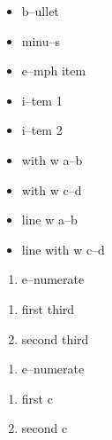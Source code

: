\documentclass{book}
\begin{document}
\begin{titlepage}
\begin{itemize}[label=\textbullet{}]
\item b--ullet
\end{itemize}

\begin{itemize}[label=-]
\item minu--s
\end{itemize}

\begin{itemize}[label=\emph{after emph}]
\item e--mph item
\end{itemize}

\begin{itemize}[label=\textbullet{} a--n itemize line]
\item {}%
i--tem 1
\item i--tem 2
\end{itemize}

\begin{itemize}[label={}]
\item with w a--b
\item with w c--d
\end{itemize}

\begin{itemize}[label=\hbox{} on a line]
\item line w a--b
\item line with w c--d
\end{itemize}

\begin{enumerate}[start=1]
\item e--numerate
\end{enumerate}

\begin{enumerate}[start=3]
\item first third
\item second third
\end{enumerate}

\begin{enumerate}[label=\alph*.]
\item e--numerate
\end{enumerate}

\begin{enumerate}[label=\alph*.,start=3]
\item first c
\item second c
\end{enumerate}


\end{titlepage}
\end{document}
